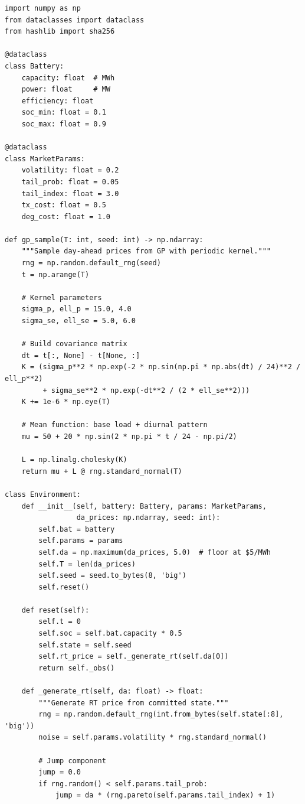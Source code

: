 \documentclass[11pt]{article}
\begin{document}
\begin{lstlisting}[style=python, caption=Level 1 Instance Generator]
import numpy as np
from dataclasses import dataclass
from hashlib import sha256

@dataclass
class Battery:
    capacity: float  # MWh
    power: float     # MW
    efficiency: float
    soc_min: float = 0.1
    soc_max: float = 0.9

@dataclass  
class MarketParams:
    volatility: float = 0.2
    tail_prob: float = 0.05
    tail_index: float = 3.0
    tx_cost: float = 0.5
    deg_cost: float = 1.0

def gp_sample(T: int, seed: int) -> np.ndarray:
    """Sample day-ahead prices from GP with periodic kernel."""
    rng = np.random.default_rng(seed)
    t = np.arange(T)
    
    # Kernel parameters
    sigma_p, ell_p = 15.0, 4.0
    sigma_se, ell_se = 5.0, 6.0
    
    # Build covariance matrix
    dt = t[:, None] - t[None, :]
    K = (sigma_p**2 * np.exp(-2 * np.sin(np.pi * np.abs(dt) / 24)**2 / ell_p**2)
         + sigma_se**2 * np.exp(-dt**2 / (2 * ell_se**2)))
    K += 1e-6 * np.eye(T)
    
    # Mean function: base load + diurnal pattern
    mu = 50 + 20 * np.sin(2 * np.pi * t / 24 - np.pi/2)
    
    L = np.linalg.cholesky(K)
    return mu + L @ rng.standard_normal(T)

class Environment:
    def __init__(self, battery: Battery, params: MarketParams, 
                 da_prices: np.ndarray, seed: int):
        self.bat = battery
        self.params = params
        self.da = np.maximum(da_prices, 5.0)  # floor at $5/MWh
        self.T = len(da_prices)
        self.seed = seed.to_bytes(8, 'big')
        self.reset()
    
    def reset(self):
        self.t = 0
        self.soc = self.bat.capacity * 0.5
        self.state = self.seed
        self.rt_price = self._generate_rt(self.da[0])
        return self._obs()
    
    def _generate_rt(self, da: float) -> float:
        """Generate RT price from committed state."""
        rng = np.random.default_rng(int.from_bytes(self.state[:8], 'big'))
        noise = self.params.volatility * rng.standard_normal()
        
        # Jump component
        jump = 0.0
        if rng.random() < self.params.tail_prob:
            jump = da * (rng.pareto(self.params.tail_index) + 1)
        

\end{lstlisting}
\end{document}
